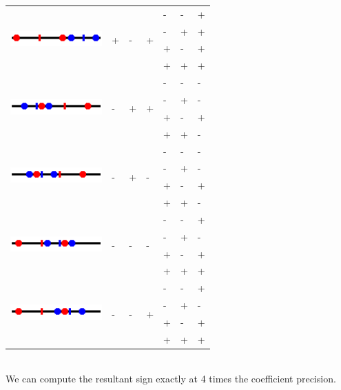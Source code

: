 \documentclass{article}
\begin{document}
\begin{tabular}{|l|lll|ll|l|}
  \multirow{4}{*}{\includegraphics[width=100pt]{imgs/root_orderings_case8.png}}
  & \multirow{4}{*}{+} & \multirow{4}{*}{-} & \multirow{4}{*}{+}
     & - & - & + \\
  &&&& - & + & + \\
  &&&& + & - & + \\
  &&&& + & + & + \\ \hline
  
  \multirow{4}{*}{\includegraphics[width=100pt]{imgs/root_orderings_case2.png}}
  & \multirow{4}{*}{-} & \multirow{4}{*}{+} & \multirow{4}{*}{+}
     & - & - & - \\
  &&&& - & + & - \\
  &&&& + & - & + \\
  &&&& + & + & - \\ \hline
  
  \multirow{4}{*}{\includegraphics[width=100pt]{imgs/root_orderings_case3.png}}
  & \multirow{4}{*}{-} & \multirow{4}{*}{+} & \multirow{4}{*}{-}
     & - & - & - \\
  &&&& - & + & - \\
  &&&& + & - & + \\
  &&&& + & + & - \\ \hline
  
  \multirow{4}{*}{\includegraphics[width=100pt]{imgs/root_orderings_case6.png}}
  & \multirow{4}{*}{-} & \multirow{4}{*}{-} & \multirow{4}{*}{-}
     & - & - & + \\
  &&&& - & + & - \\
  &&&& + & - & + \\
  &&&& + & + & + \\ \hline
  
  \multirow{4}{*}{\includegraphics[width=100pt]{imgs/root_orderings_case7.png}}
  & \multirow{4}{*}{-} & \multirow{4}{*}{-} & \multirow{4}{*}{+} & - & - & + \\
  &&&& - & + & - \\
  &&&& + & - & + \\
  &&&& + & + & + \\ \hline
\end{tabular}
\vspace{1mm}\\
\noindent
We can compute the resultant sign exactly at 4 times the coefficient
precision.
\end{document}
